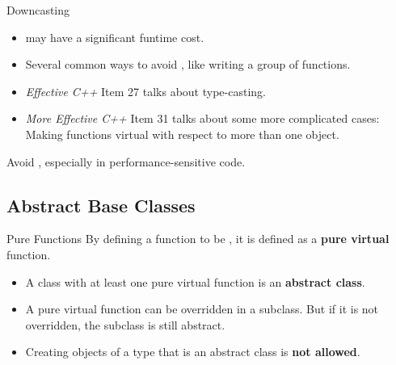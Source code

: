 \documentclass{beamer}
\begin{document}
\begin{frame}{Downcasting}
    \begin{itemize}
        \item {} may have a significant funtime cost.
        \item Several common ways to avoid , like writing a group of \virtual functions.
        \item \textit{Effective C++} Item 27 talks about type-casting.
        \item \textit{More Effective C++} Item 31 talks about some more complicated cases: Making functions virtual with respect to more than one object.
    \end{itemize}
    \begin{notice}
        Avoid , especially in performance-sensitive code.
    \end{notice}
\end{frame}

\subsection{Abstract Base Classes}

\begin{frame}[fragile]{Pure \virtual Functions}
    By defining a function to be , it is defined as a \textbf{pure virtual} function.
    \begin{itemize}
        \item A class with at least one pure virtual function is an \textbf{abstract class}.
        \item A pure virtual function can be overridden in a subclass. But if it is not overridden, the subclass is still abstract.
        \item Creating objects of a type that is an abstract class is \textbf{not allowed}.
    \end{itemize}
\end{frame}
\end{document}
